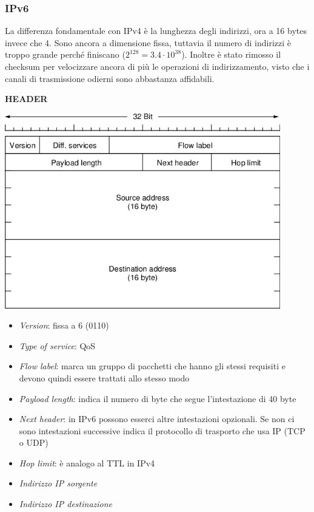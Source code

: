 \documentclass[10pt,a4paper,twoside]{article}
\begin{document}
\subsubsection{IPv6}
\begin{minipage}{0.5\textwidth}
La differenza fondamentale con IPv4 è la lunghezza degli indirizzi, ora a 16 bytes invece che 4. Sono ancora a dimensione fissa, tuttavia il numero di indirizzi è troppo grande perché finiscano ($2^{128}=3.4\cdot 10^{38}$). Inoltre è stato rimosso il checksum per velocizzare ancora di più le operazioni di indirizzamento, visto che i canali di trasmissione odierni sono abbastanza affidabili.
\end{minipage}
\begin{minipage}{0.5\textwidth}
\textbf{HEADER}
\begin{flushright}
\includegraphics[width=0.9\textwidth]{images/header_ipv6.png}
\end{flushright}
\end{minipage}
\begin{itemize}
\item \textit{Version}: fissa a 6 (0110)
\item \textit{Type of service}: QoS
\item \textit{Flow label}: marca un gruppo di pacchetti che hanno gli stessi requisiti e devono quindi essere trattati allo stesso modo
\item \textit{Payload length}: indica il numero di byte che segue l'intestazione di 40 byte
\item \textit{Next header}: in IPv6 possono esserci altre intestazioni opzionali. Se non ci sono intestazioni successive indica il protocollo di trasporto che usa IP (TCP o UDP)
\item \textit{Hop limit}: è analogo al TTL in IPv4
\item \textit{Indirizzo IP sorgente}
\item \textit{Indirizzo IP destinazione}
\end{itemize}
\end{document}
